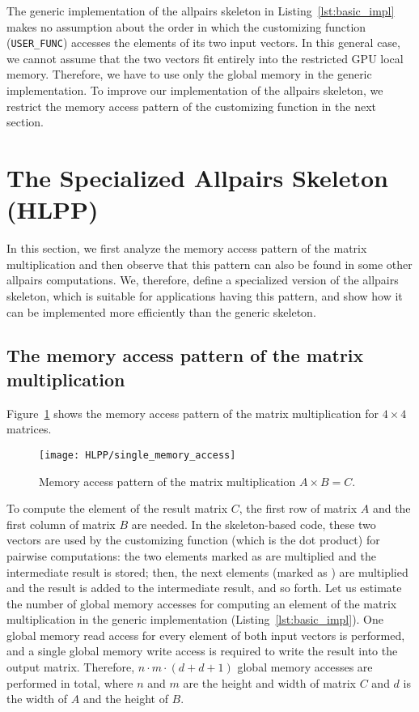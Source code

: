 The generic implementation of the allpairs skeleton in Listing~\ref{lst:basic_impl} makes no assumption about the order in which the customizing function (\texttt{USER\_FUNC}) accesses the elements of its two input vectors.
In this general case, we cannot assume that the two vectors fit entirely into the restricted GPU local memory.
Therefore, we have to use only the global memory in the generic implementation.
To improve our implementation of the allpairs skeleton, we restrict the memory access pattern of the customizing function in the next section.


\section{The Specialized Allpairs Skeleton (HLPP)}
\label{sec:opt_allpairs_skeleton}
In this section, we first analyze the memory access pattern of the matrix multiplication and then observe that this pattern can also be found in some other allpairs computations.
We, therefore, define a specialized version of the allpairs skeleton, which is suitable for applications having this pattern, and show how it can be implemented more efficiently than the generic skeleton.

\subsection{The memory access pattern of the matrix multiplication}
Figure~\ref{fig:single_memory_access} shows the memory access pattern of the matrix multiplication for $4\times 4$ matrices.
\begin{figure}[t]
  \centering
  \texttt{[image: HLPP/single\_memory\_access]}
  \caption{Memory access pattern of the matrix multiplication $A\times B = C$.}
  \label{fig:single_memory_access}
\end{figure}
To compute the element  of the result matrix $C$, the first row of matrix $A$ and the first column of matrix $B$ are needed.
In the skeleton-based code, these two vectors are used by the customizing function (which is the dot product) for pairwise computations:
the two elements marked as  are multiplied and the intermediate result is stored;
then, the next elements (marked as ) are multiplied and the result is added to the intermediate result, and so forth.
Let us estimate the number of global memory accesses for computing an element of the matrix multiplication in the generic implementation (Listing~\ref{lst:basic_impl}).
One global memory read access for every element of both input vectors is performed, and a single global memory write access is required to write the result into the output matrix.
Therefore, $n\cdot m\cdot (d + d + 1)$ global memory accesses are performed in total, where $n$ and $m$ are the height and width of matrix $C$ and $d$ is the width of $A$ and the height of $B$.


